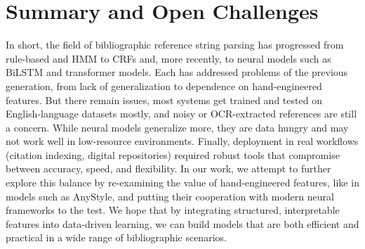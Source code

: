 \section{Summary and Open Challenges}
In short, the field of bibliographic reference string parsing has progressed from rule-based and HMM to CRFs and, more recently, to neural models such as BiLSTM and transformer models. Each has addressed problems of the previous generation, from lack of generalization to dependence on hand-engineered features.
But there remain issues, most systems get trained and tested on English-language datasets mostly, and noisy or OCR-extracted references are still a concern. While neural models generalize more, they are data hungry and may not work well in low-resource environments. Finally, deployment in real workflows (citation indexing, digital repositories) required robust tools that compromise between accuracy, speed, and flexibility.
In our work, we attempt to further explore this balance by re-examining the value of hand-engineered features, like in models such as AnyStyle, and putting their cooperation with modern neural frameworks to the test. We hope that by integrating structured, interpretable features into data-driven learning, we can build models that are both efficient and practical in a wide range of bibliographic scenarios.
